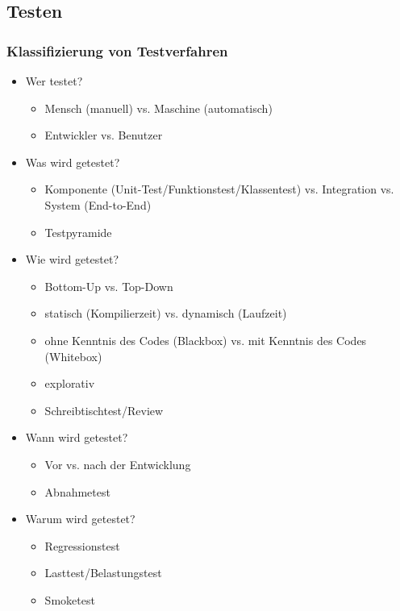 \subsection{Testen}
\label{sec:Testen}

\subsubsection{Klassifizierung von Testverfahren}
\label{sec:KlassifizierungTestverfahren}

\begin{itemize}
	\item Wer testet?
	\begin{itemize}
		\item Mensch (manuell) vs. Maschine (automatisch)
		\item Entwickler vs. Benutzer
	\end{itemize}
	\item Was wird getestet?
	\begin{itemize}
		\item Komponente (Unit-Test/Funktionstest/Klassentest) vs. Integration vs. System (End-to-End)
		\item Testpyramide
	\end{itemize}
	\item Wie wird getestet?
	\begin{itemize}
		\item Bottom-Up vs. Top-Down
		\item statisch (Kompilierzeit) vs. dynamisch (Laufzeit)
		\item ohne Kenntnis des Codes (Blackbox) vs. mit Kenntnis des Codes (Whitebox)
		\item explorativ
		\item Schreibtischtest/Review
	\end{itemize}
	\item Wann wird getestet?
	\begin{itemize}
		\item Vor vs. nach der Entwicklung
		\item Abnahmetest
	\end{itemize}
	\item Warum wird getestet?
	\begin{itemize}
		\item Regressionstest
		\item Lasttest/Belastungstest
		\item Smoketest
	\end{itemize}
\end{itemize}

